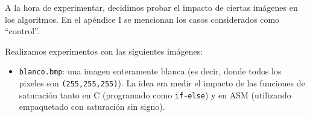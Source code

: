 	A la hora de experimentar, decidimos probar el impacto de ciertas imágenes en los algoritmos. En el apéndice I se mencionan los casos considerados como “control”.

 	Realizamos experimentos con las siguientes imágenes:

 	\begin{itemize}
 		\item \texttt{blanco.bmp}: una imagen enteramente blanca (es decir, donde todos los pixeles son \texttt{(255,255,255)}). La idea era medir el impacto de las funciones de saturación tanto en C (programado como \texttt{if-else}) y en ASM (utilizando empaquetado con saturación sin signo).
 	\end{itemize}